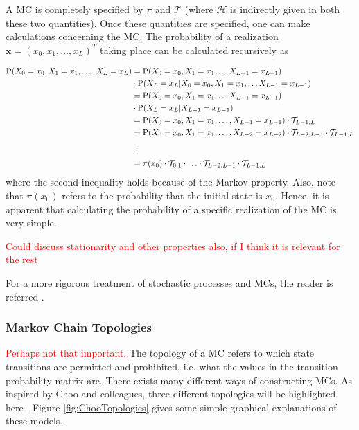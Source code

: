 \documentclass{article}
\begin{document}
A MC is completely specified by $\pi$ and $\mathcal{T}$ (where $\mathcal{H}$ is indirectly given in both these two quantities). Once these quantities are specified, one can make calculations concerning the MC. The probability of a realization $\mathbf{x} = (x_0, x_1, \ldots, x_L)^T$ taking place can be calculated recursively as

\begin{align*}
    \text{P}(X_0 = x_0, X_1 = x_1, \ldots, X_L = x_L) &= \text{P}(X_0 = x_0, X_1 = x_1, \ldots X_{L-1} = x_{L-1})\\ 
    &\cdot\text{P}(X_L = x_L|X_0 = x_0, X_1 = x_1, \ldots X_{L-1} = x_{L-1}) \\ 
    &= \text{P}(X_0 = x_0, X_1 = x_1, \ldots X_{L-1} = x_{L-1})\\&\cdot\text{P}(X_L = x_L|X_{L-1} = x_{L-1}) \\ 
    &= \text{P}(X_0 = x_0, X_1 = x_1, \ldots, X_{L-1} = x_{L-1})\cdot\mathcal{T}_{L-1, L} \\ 
    &= \text{P}(X_0 = x_0, X_1 = x_1, \ldots, X_{L-2} = x_{L-2})\cdot \mathcal{T}_{L-2, L-1}\cdot\mathcal{T}_{L-1, L} \\ & \hspace{0.5em}\vdots \\ &= \pi(x_0)\cdot\mathcal{T}_{0,1}\cdot \ldots \cdot \mathcal{T}_{L-2, L-1} \cdot\mathcal{T}_{L-1, L}
\end{align*}
where the second inequality holds because of the Markov property. Also, note that $\pi(x_0)$ refers to the probability that the initial state is $x_0$. Hence, it is apparent that calculating the probability of a specific realization of the MC is very simple. 

\textcolor{red}{Could discuss stationarity and other properties also, if I think it is relevant for the rest}

For a more rigorous treatment of stochastic processes and MCs, the reader is referred \cite{Pinsky2011}.

\subsubsection{Markov Chain Topologies}
\textcolor{red}{Perhaps not that important.}
The topology of a MC refers to which state transitions are permitted and prohibited, i.e. what the values in the transition probability matrix are. There exists many different ways of constructing MCs. As inspired by Choo and colleagues, three different topologies will be highlighted here \cite{Choo2004}. Figure \ref{fig:ChooTopologies} gives some simple graphical explanations of these models. 
\end{document}
